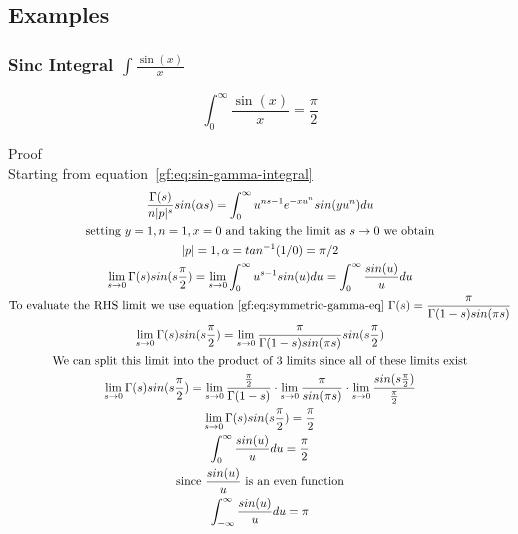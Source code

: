 \documentclass[a4paper]{article}
\begin{document}
    \subsection{Examples}\label{gf:subsec:examples}

    \subsubsection{Sinc Integral \texorpdfstring{$\int \frac{\sin(x)}{x}$}{}}

    \begin{theorem}
        \begin{equation}
            \boxed{
                \int_{0}^{\infty} \frac{\sin(x)}{x} = \frac{\pi}{2}
            }\label{gf:eq:equation18}
        \end{equation}

        Proof
        \\
        Starting from equation~\ref{gf:eq:sin-gamma-integral}
        \begin{gather*}
            \frac{\Gamma(s)}{n |p|^s} sin(\alpha s)= \int_{0}^{\infty} u^{ns -1} e^{-x u^{n}} sin(y u^n) du
            \\
            \text{setting $y=1, n=1, x=0$ and taking the limit as $s \to 0$ we obtain}
            \\
            |p| = 1, \alpha = tan^{-1}(1/0) = \pi/2
            \\
            \lim_{s \to 0} \Gamma(s) sin(s \frac{\pi}{2})= \lim_{s \to 0} \int_{0}^{\infty} u^{s -1} sin(u) du  = \int_{0}^{\infty} \frac{sin(u)}{u} du
            \\
            \text{To evaluate the RHS limit we use equation~\ref{gf:eq:symmetric-gamma-eq}  } \Gamma(s) = \frac{\pi}{\Gamma(1-s)sin(\pi s)}
            \\
            \lim_{s \to 0} \Gamma(s) sin(s \frac{\pi}{2})= \lim_{s \to 0} \frac{\pi}{\Gamma(1-s)sin(\pi s)} sin(s \frac{\pi}{2})
            \\
            \text{We can split this limit into the product of 3 limits since all of these limits exist}
            \\
            \lim_{s \to 0} \Gamma(s) sin(s \frac{\pi}{2})= \lim_{s \to 0}  \frac{\frac{\pi}{2}}{\Gamma(1-s)} \cdot
            \lim_{s \to 0}
            \frac{\pi}{sin(\pi s)}
            \cdot
            \lim_{s \to 0}
            \frac{sin(s \frac{\pi}{2})}{\frac{\pi}{2}}
            \\
            \lim_{s \to 0} \Gamma(s) sin(s \frac{\pi}{2})= \frac{\pi}{2}
            \\
            \int_{0}^{\infty} \frac{sin(u)}{u} du = \frac{\pi}{2}
            \\
            \text{since } \frac{sin(u)}{u} \text{ is an even function}
            \\
            \int_{-\infty}^{\infty} \frac{sin(u)}{u} du = \pi
        \end{gather*}
    \end{theorem}
\end{document}
